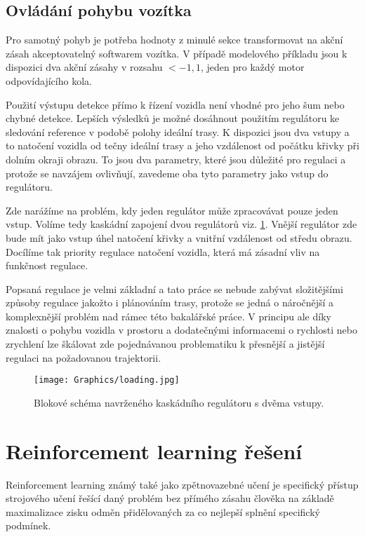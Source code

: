 \documentclass[czech, bc, kky, he, iso690numb]{fasthesis}
\begin{document}
            \subsection{Ovládání pohybu vozítka}
            	Pro samotný pohyb je potřeba hodnoty z minulé sekce transformovat na akční zásah akceptovatelný softwarem vozítka. V případě modelového příkladu jsou k dispozici dva akční zásahy v rozsahu \(<-1,1\), jeden pro každý motor odpovídajícího kola.
            	
                Použití výstupu detekce přímo k řízení vozidla není vhodné pro jeho šum nebo chybné detekce. Lepších výsledků je možné dosáhnout použitím regulátoru ke sledování reference v podobě polohy ideální trasy. K dispozici jsou dva vstupy a to natočení vozidla od tečny ideální trasy a jeho vzdálenost od počátku křivky při dolním okraji obrazu. To jsou dva parametry, které jsou důležité pro regulaci a protože se navzájem ovlivňují, zavedeme oba tyto parametry jako vstup do regulátoru.
                
                Zde narážíme na problém, kdy jeden regulátor může zpracovávat pouze jeden vstup. Volíme tedy kaskádní zapojení dvou regulátorů viz. \ref{pic:regulator_schema}. Vnější regulátor zde bude mít jako vstup úhel natočení křivky a vnitřní vzdálenost od středu obrazu. Docílíme tak priority regulace natočení vozidla, která má zásadní vliv na funkčnost regulace.
                
                Popsaná regulace je velmi základní a tato práce se nebude zabývat složitějšími způsoby regulace jakožto i plánováním trasy, protože se jedná o náročnější a komplexnější problém nad rámec této bakalářské práce. V principu ale díky znalosti o pohybu vozidla v prostoru a dodatečnými informacemi o rychlosti nebo zrychlení lze škálovat zde pojednávanou problematiku k přesnější a jistější regulaci na požadovanou trajektorii.
                
                \begin{figure}[h]
                	\centering
                	\texttt{[image: Graphics/loading.jpg]}
                	\caption{Blokové schéma navrženého kaskádního regulátoru s dvěma vstupy.}
                	\label{pic:regulator_schema}
                \end{figure}
            
        \section{Reinforcement learning řešení}
            Reinforcement learning známý také jako zpětnovazebné učení je specifický přístup strojového učení řešící daný problém bez přímého zásahu člověka na základě maximalizace zisku odměn přidělovaných za co nejlepší splnění specifický podmínek.
            
\end{document}
